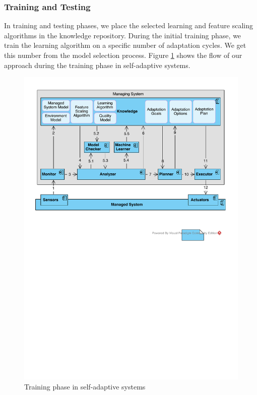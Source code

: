 \documentclass[a4paper,12pt]{article}
\begin{document}
\subsubsection{Training and Testing} \label{TrainingAndTesting}
In training and testing phases, we place the selected learning and feature scaling algorithms in the knowledge repository. During the initial training phase, we train the learning algorithm on a specific number of adaptation cycles. We get this number from the model selection process. Figure \ref{TrainingView} shows the flow of our approach during the training phase in self-adaptive systems.
\begin{figure}[H]
	\centering
	\includegraphics[keepaspectratio, width=\linewidth]{figures/TrainingView.pdf}
	\caption{Training phase in self-adaptive systems}
	\label{TrainingView}
\end{figure}
\end{document}
